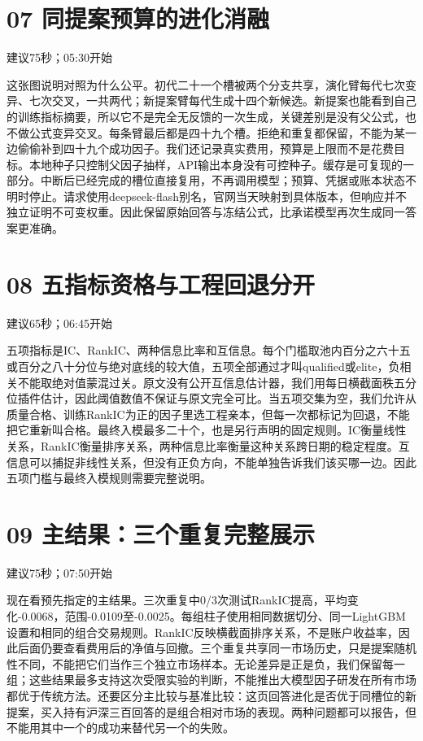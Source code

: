 \documentclass[UTF8,a4paper,11pt]{ctexart}
\begin{document}
\section*{\color{ink}07 同提案预算的进化消融}
{\small\color{accent}建议75秒；05:30开始}\par
这张图说明对照为什么公平。初代二十一个槽被两个分支共享，演化臂每代七次变异、七次交叉，一共两代；新提案臂每代生成十四个新候选。新提案也能看到自己的训练指标摘要，所以它不是完全无反馈的一次生成，关键差别是没有父公式，也不做公式变异交叉。每条臂最后都是四十九个槽。拒绝和重复都保留，不能为某一边偷偷补到四十九个成功因子。我们还记录真实费用，预算是上限而不是花费目标。本地种子只控制父因子抽样，API输出本身没有可控种子。缓存是可复现的一部分。中断后已经完成的槽位直接复用，不再调用模型；预算、凭据或账本状态不明时停止。请求使用deepseek-flash别名，官网当天映射到具体版本，但响应并不独立证明不可变权重。因此保留原始回答与冻结公式，比承诺模型再次生成同一答案更准确。
\section*{\color{ink}08 五指标资格与工程回退分开}
{\small\color{accent}建议65秒；06:45开始}\par
五项指标是IC、RankIC、两种信息比率和互信息。每个门槛取池内百分之六十五或百分之八十分位与绝对底线的较大值，五项全部通过才叫qualified或elite，负相关不能取绝对值蒙混过关。原文没有公开互信息估计器，我们用每日横截面秩五分位插件估计，因此阈值数值不保证与原文完全可比。当五项交集为空，我们允许从质量合格、训练RankIC为正的因子里选工程亲本，但每一次都标记为回退，不能把它重新叫合格。最终入模最多二十个，也是另行声明的固定规则。IC衡量线性关系，RankIC衡量排序关系，两种信息比率衡量这种关系跨日期的稳定程度。互信息可以捕捉非线性关系，但没有正负方向，不能单独告诉我们该买哪一边。因此五项门槛与最终入模规则需要完整说明。
\newpage
\section*{\color{ink}09 主结果：三个重复完整展示}
{\small\color{accent}建议75秒；07:50开始}\par
现在看预先指定的主结果。三次重复中0/3次测试RankIC提高，平均变化-0.0068，范围-0.0109至-0.0025。每组柱子使用相同数据切分、同一LightGBM设置和相同的组合交易规则。RankIC反映横截面排序关系，不是账户收益率，因此后面仍要查看费用后的净值与回撤。三个重复共享同一市场历史，只是提案随机性不同，不能把它们当作三个独立市场样本。无论差异是正是负，我们保留每一组；这些结果最多支持这次受限实验的判断，不能推出大模型因子研发在所有市场都优于传统方法。还要区分主比较与基准比较：这页回答进化是否优于同槽位的新提案，买入持有沪深三百回答的是组合相对市场的表现。两种问题都可以报告，但不能用其中一个的成功来替代另一个的失败。
\end{document}
